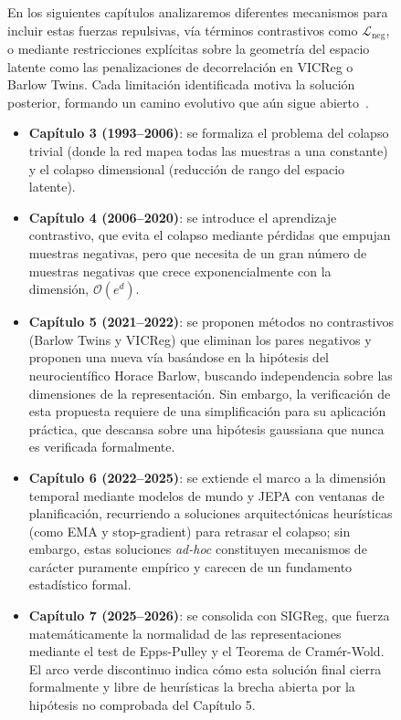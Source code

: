 \begin{figure}[!ht]
En los siguientes capítulos analizaremos diferentes  mecanismos para incluir estas fuerzas repulsivas, vía términos contrastivos como $\mathcal{L}_{\text{neg}}$, o mediante restricciones explícitas sobre la geometría del espacio latente como las penalizaciones de decorrelación en VICReg o Barlow Twins.
Cada limitación identificada motiva la solución posterior, formando un camino evolutivo que aún sigue abierto~\cite{klindt2026lejepa}.
\begin{itemize}
    \item \textbf{Capítulo 3 (1993--2006)}: se formaliza el problema del colapso trivial (donde la red mapea todas las muestras a una constante) y el colapso dimensional (reducción de rango del espacio latente).
    \item \textbf{Capítulo 4 (2006--2020)}: se introduce el aprendizaje contrastivo, que evita el colapso mediante pérdidas que empujan muestras negativas, pero que necesita de un gran número de muestras negativas que crece exponencialmente con la dimensión, $\mathcal{O}(e^d)$.
    \item \textbf{Capítulo 5 (2021--2022)}: se proponen métodos no contrastivos (Barlow Twins y VICReg) que eliminan los pares negativos y proponen una nueva vía basándose en la hipótesis del neurocientífico Horace Barlow, buscando independencia sobre las dimensiones de la representación. Sin embargo, la verificación de esta propuesta requiere de una simplificación para su aplicación práctica, que descansa sobre una hipótesis gaussiana que nunca es verificada formalmente.
    \item \textbf{Capítulo 6 (2022--2025)}: se extiende el marco a la dimensión temporal mediante modelos de mundo y JEPA con ventanas de planificación, recurriendo a soluciones arquitectónicas heurísticas (como EMA y stop-gradient) para retrasar el colapso; sin embargo, estas soluciones \textit{ad-hoc} constituyen mecanismos de carácter puramente empírico y carecen de un fundamento estadístico formal.
    \item \textbf{Capítulo 7 (2025--2026)}: se consolida con SIGReg, que fuerza matemáticamente la normalidad de las representaciones mediante el test de Epps-Pulley y el Teorema de Cramér-Wold. El arco verde discontinuo indica cómo esta solución final cierra formalmente y libre de heurísticas la brecha abierta por la hipótesis no comprobada del Capítulo 5.
\end{itemize}
\end{figure}
